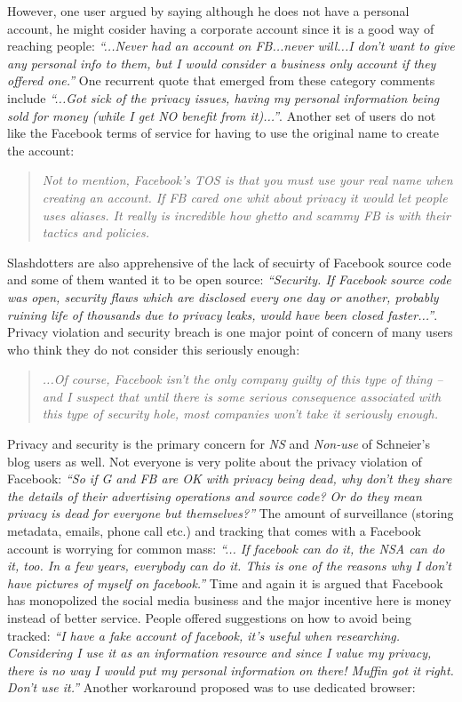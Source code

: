     However, one user argued by saying although he does not have a personal account, he might cosider having a corporate account since it is a good way of reaching people: \textit{``...Never had an account on FB...never will...I don't want to give any personal info to them, but I would consider a business only account if they offered one.''} One recurrent quote that emerged from these category comments include \textit{``...Got sick of the privacy issues, having my personal information being sold for money (while I get NO benefit from it)...''}. Another set of users do not like the Facebook terms of service for having to use the original name to create the account: \begin{quote}
         \textit{Not to mention, Facebook's TOS is that you must use your real name when creating an account. If FB cared one whit about privacy it would let people uses aliases. It really is incredible how ghetto and scammy FB is with their tactics and policies. }
         \end{quote} 
    Slashdotters are also apprehensive of the lack of secuirty of Facebook source code and some of them wanted it to be open source: \textit{``Security. If Facebook source code was open, security flaws which are disclosed every one day or another, probably ruining life of thousands due to privacy leaks, would have been closed faster...''}. Privacy violation and security breach is one major point of concern of many users who think they do not consider this seriously enough:
    \begin{quote}
         \textit{...Of course, Facebook isn't the only company guilty of this type of thing -- and I suspect that until there is some serious consequence associated with this type of security hole, most companies won't take it seriously enough.}
    \end{quote}
    
    Privacy and security is the primary concern for \emph{NS} and \emph{Non-use} of Schneier's blog users as well. Not everyone is very polite about the privacy violation of Facebook: \textit{``So if G and FB are OK with privacy being dead, why don't they share the details of their advertising operations and source code? Or do they mean privacy is dead for everyone but themselves?''} The amount of surveillance (storing metadata, emails, phone call etc.) and tracking that comes with a Facebook account is worrying for common mass: \textit{``... If facebook can do it, the NSA can do it, too. In a few years, everybody can do it. This is one of the reasons why I don't have pictures of myself on facebook.''} Time and again it is argued that Facebook has monopolized the social media business and the major incentive here is money instead of better service. People offered suggestions on how to avoid being tracked: \textit{``I have a fake account of facebook, it's useful when researching. Considering I use it as an information resource and since I value my privacy, there is no way I would put my personal information on there! Muffin got it right. Don't use it.''} Another workaround proposed was to use dedicated browser:

